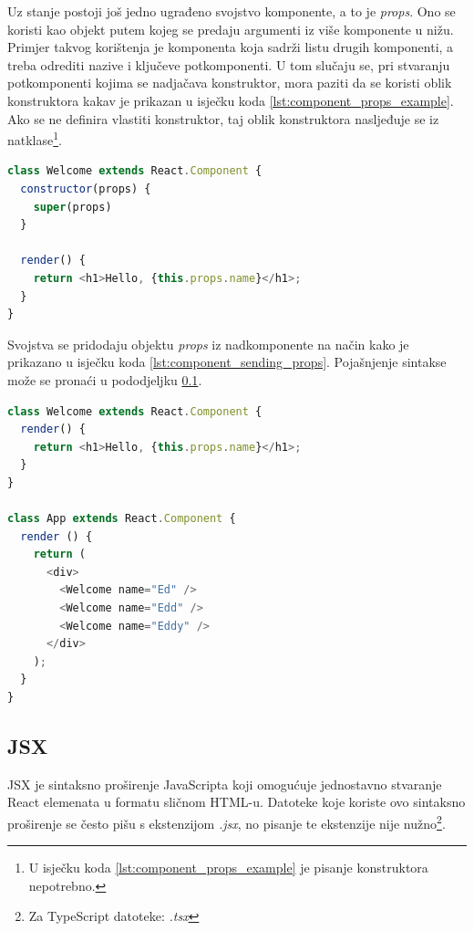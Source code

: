 \documentclass[times, utf8, zavrsni, numeric]{fer}
\newcommand{\razmakp}{\vspace{18pt}}
\newcommand{\razmaks}{\vspace{10pt}}
\begin{document}
\razmakp
\razmakp

Uz stanje postoji još jedno ugrađeno svojstvo komponente, a to je \emph{props}\citep{reactDocsComp&Props}.
Ono se koristi kao objekt putem kojeg se predaju argumenti iz više komponente u nižu.
Primjer takvog korištenja je komponenta koja sadrži listu drugih komponenti, a treba odrediti nazive i ključeve potkomponenti.
U tom slučaju se, pri stvaranju potkomponenti kojima se nadjačava konstruktor, mora paziti da se koristi oblik konstruktora kakav je prikazan u isječku koda \ref{lst:component_props_example}.
Ako se ne definira vlastiti konstruktor, taj oblik konstruktora nasljeđuje se iz natklase\footnote{U isječku koda \ref{lst:component_props_example} je pisanje konstruktora nepotrebno.}.

\razmakp
\begin{lstlisting}[language=JavaScript, caption={Primjer komponente s \emph{props}}, label={lst:component_props_example}]
class Welcome extends React.Component {
  constructor(props) {
    super(props)
  }

  render() {
    return <h1>Hello, {this.props.name}</h1>;
  }
}
\end{lstlisting}
\razmaks

Svojstva se pridodaju objektu \emph{props} iz nadkomponente na način kako je prikazano u isječku koda \ref{lst:component_sending_props}.
Pojašnjenje sintakse može se pronaći u pododjeljku \ref{sec:jsx}.

\razmakp
\begin{lstlisting}[language=JavaScript, caption={Primjer korištenja \emph{props}}, label={lst:component_sending_props}]
class Welcome extends React.Component {
  render() {
    return <h1>Hello, {this.props.name}</h1>;
  }
}

class App extends React.Component {
  render () {
    return (
      <div>
        <Welcome name="Ed" />
        <Welcome name="Edd" />
        <Welcome name="Eddy" />
      </div>
    );
  }
}
\end{lstlisting}
\razmaks


\subsection{JSX} \label{sec:jsx}

JSX je sintaksno proširenje JavaScripta koji omogućuje jednostavno stvaranje React elemenata u formatu sličnom HTML-u.
Datoteke koje koriste ovo sintaksno proširenje se često pišu s ekstenzijom \glqq \emph{ .jsx}\grqq , no pisanje te ekstenzije nije nužno\footnote{Za TypeScript datoteke: \glqq \emph{ .tsx}\grqq }.
\end{document}
